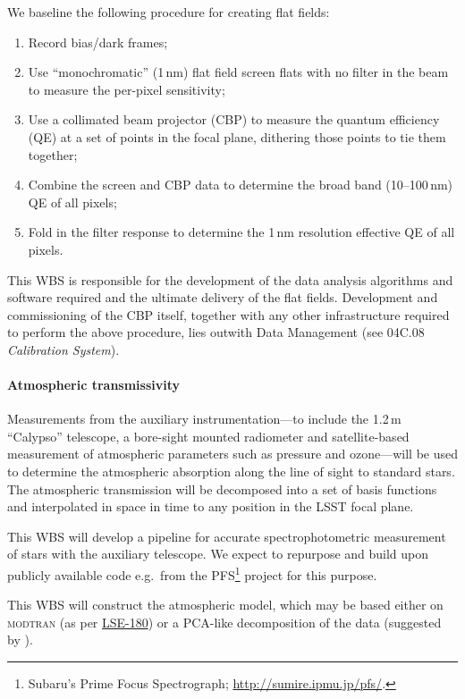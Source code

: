 \documentclass[12pt]{article}
\newcommand{\ds}[2]{{\color{blue} \href{https://docushare.lsstcorp.org/docushare/dsweb/Get/#1}{#2}}\xspace}
\newcommand{\NewPCP}{\ds{LSE-180}{LSE-180}}
\begin{document}
We baseline the following procedure for creating flat fields:

\begin{enumerate}
  \item{Record bias/dark frames;}
  \item{Use ``monochromatic'' (1\,nm) flat field screen flats with no filter in the beam to measure the per-pixel sensitivity;}
  \item{Use a collimated beam projector (CBP) to measure the quantum efficiency (QE) at a set of points in the focal plane, dithering those points to tie them together;}
  \item{Combine the screen and CBP data to determine the broad band (10--100\,nm) QE of all pixels;}
  \item{Fold in the filter response to determine the 1\,nm resolution effective QE of all pixels.}
\end{enumerate}

This WBS is responsible for the development of the data analysis algorithms and software required and the ultimate delivery of the flat fields. Development and commissioning of the CBP itself, together with any other infrastructure required to perform the above procedure, lies outwith Data Management (see 04C.08 \emph{Calibration System}).

\paragraph{Atmospheric transmissivity}

Measurements from the auxiliary instrumentation---to include the 1.2\,m ``Calypso'' telescope, a bore-sight mounted radiometer and satellite-based measurement of atmospheric parameters such as pressure and ozone---will be used to determine the atmospheric absorption along the line of sight to standard stars. The atmospheric transmission will be decomposed into a set of basis functions and interpolated in space in time to any position in the LSST focal plane.

This WBS will develop a pipeline for accurate spectrophotometric measurement of stars with the auxiliary telescope. We expect to repurpose and build upon publicly available code e.g.\ from the PFS\footnote{Subaru's Prime Focus Spectrograph; \url{http://sumire.ipmu.jp/pfs/}.} project for this purpose.

This WBS will construct the atmospheric model, which may be based either on \textsc{modtran} (as per \NewPCP{}) or a PCA-like decomposition of the data (suggested by \cite{Lupton15}).
\end{document}
